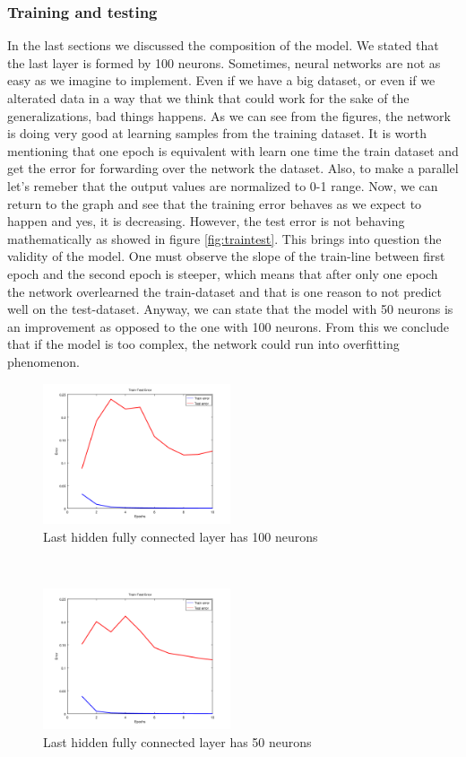\subsubsection{Training and testing}
In the last sections we discussed the composition of the model. We stated that the last layer is formed by 100 neurons. Sometimes, neural networks are not as easy as we imagine to implement. Even if we have a big dataset, or even if we alterated data in a way that we think that could work for the sake of the generalizations, bad things happens. As we can see from the figures, the network is doing very good at learning samples from the training dataset. It is worth mentioning that one epoch is equivalent with learn one time the train dataset and get the error for forwarding over the network the dataset. Also, to make a parallel let's remeber that the output values are normalized to 0-1 range. Now, we can return to the graph and see that the training error behaves as we expect to happen and yes, it is decreasing. However, the test error is not behaving mathematically as showed in figure \ref{fig:traintest}. This brings into question the validity of the model. One must observe the slope of the train-line between first epoch and the second epoch is steeper, which means that after only one epoch the network overlearned the train-dataset and that is one reason to not predict well on the test-dataset. Anyway, we can state that the model with 50 neurons is an improvement as opposed to the one with 100 neurons. From this we conclude that if the model is too complex, the network could run into overfitting phenomenon.
\begin{figure}[h]
	\begin{center}
		\includegraphics[width=209px,height=157px]{src/img/system-design/train-test-100}
		\caption{Last hidden fully connected layer has 100 neurons} \label{fig:50tt}
    \end{center}
\end{figure}
~\\
\begin{figure}[h]
	\begin{center}
		\includegraphics[width=209px,height=157px]{src/img/system-design/train-test-50}
		\caption{Last hidden fully connected layer has 50 neurons} \label{fig:100tt}
    \end{center}
\end{figure}
\newpage